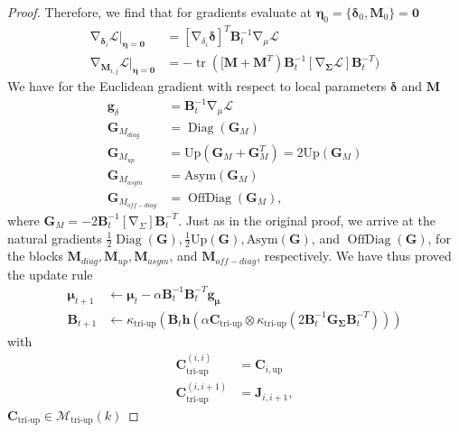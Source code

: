 \documentclass[a4paper, 11pt, oneside]{scrartcl}
\theoremstyle{break}
\DeclareMathOperator{\Diag}{Diag}
\DeclareMathOperator{\OffDiag}{OffDiag}
\DeclareMathOperator{\tr}{tr}
\DeclareMathOperator{\grad}{\nabla}
\newcommand{\matr}[1]{\boldsymbol{#1}}
\newcommand{\set}[1]{\mathcal{#1}}
\numberwithin{equation}{section}
\begin{document}
\begin{proof}
					Therefore, we find that for gradients evaluate at $\matr{\eta}_0 = \{ \matr{\delta}_0, \matr{M}_0 \} = \matr{0}$
					\begin{align*}
						\grad_{\matr{\delta}_i} \set{L} |_{\matr{\eta} = \matr{0}} &= [\grad_{\delta_i} \matr{\delta}]^T \matr{B}_t^{-1} \grad_{\mu} \set{L} \\
						\grad_{\matr{M}_{i, j}} \set{L} |_{\matr{\eta} = \matr{0}} &= -\tr ( [ \matr{M} + \matr{M}^T) \matr{B}_t^{-1} [ \grad_{\matr{\Sigma}} \set{L} ] \matr{B}_t^{-T})
					\end{align*}
					We have for the Euclidean gradient with respect to local parameters $\matr{\delta}$ and $\matr{M}$
					\begin{align*}
						\matr{g}_{\delta} &= \matr{B}_t^{-1} \grad_{\mu} \set{L} \\
						\matr{G}_{M_{diag}} &= \Diag(\matr{G}_M) \\
						\matr{G}_{M_{up}} &= \text{Up}(\matr{G}_M + \matr{G}_M^T) = 2\text{Up} (\matr{G}_M) \\
						\matr{G}_{M_{asym}} &= \text{Asym}(\matr{G}_M) \\
						\matr{G}_{M_{off-diag}} &= \OffDiag (\matr{G}_M),
					\end{align*}
					where $\matr{G}_M = -2 \matr{B}_t^{-1} [\grad_{\Sigma}] \matr{B}_t^{-T}$.
					Just as in the original proof, we arrive at the natural gradients $\frac{1}{2} \Diag(\matr{G}), \frac{1}{2} \text{Up}(\matr{G}), \text{Asym}(\matr{G})$, and $\OffDiag(\matr{G})$, for the blocks $\matr{M}_{diag}, \matr{M}_{up}, \matr{M}_{asym}$, and $\matr{M}_{off-diag}$, respectively. 
					We have thus proved the update rule 
					\begin{align*}
						\matr{\mu}_{t+1} &\leftarrow \matr{\mu}_t - \alpha \matr{B}_t^{-1} \matr{B}_t^{-T} \matr{g}_{\matr{\mu}} \\
						\matr{B}_{t+1} &\leftarrow \kappa_{\text{tri-up}} (\matr{B}_t \matr{h} (\alpha \matr{C}_{\text{tri-up}} \otimes \kappa_{\text{tri-up}} (2 \matr{B}_t^{-1} \matr{G}_{\matr{\Sigma}} \matr{B}_t^{-T})))
					\end{align*}
					with 
					\begin{align*}
						\matr{C}_{\text{tri-up}}^{(i, i)} &= \matr{C}_{i, \text{up}} \\
						\matr{C}_{\text{tri-up}}^{(i, i+1)} &= \matr{J}_{i, i+1},
					\end{align*}
					$\matr{C}_{\text{tri-up}} \in \set{M}_{\text{tri-up}} (k)$
				\end{proof}
\end{document}
